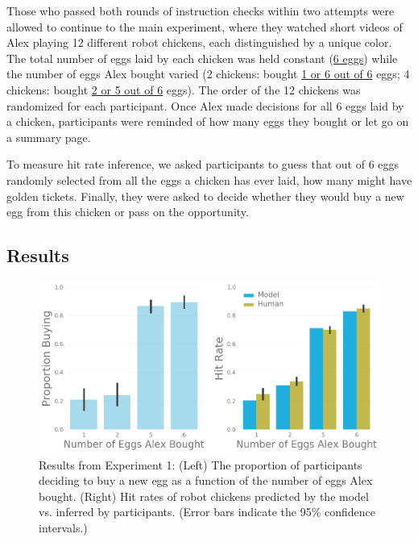 \documentclass[10pt,letterpaper]{article}
\begin{document}
Those who passed both rounds of instruction checks within two attempts were allowed to continue to the main experiment, where they watched short videos of Alex playing 12 different robot chickens, each distinguished by a unique color. The total number of eggs laid by each chicken was held constant (\underline{6 eggs}) while the number of eggs Alex bought varied (2 chickens: bought \underline{1 or 6 out of 6} eggs; 4 chickens: bought \underline{2 or 5 out of 6} eggs). The order of the 12 chickens was randomized for each participant. Once Alex made decisions for all 6 eggs laid by a chicken, participants were reminded of how many eggs they bought or let go on a summary page. 

To measure hit rate inference, we asked participants to guess that out of 6 eggs randomly selected from all the eggs a chicken has ever laid, how many might have golden tickets. Finally, they were asked to decide whether they would buy a new egg from this chicken or pass on the opportunity. 

\subsection{Results} 
\begin{figure}[t]
  \includegraphics[width=\linewidth]{exp1.png}
  \caption{Results from Experiment 1: (Left) The proportion of participants deciding to buy a new egg as a function of the number of eggs Alex bought. (Right) Hit rates of robot chickens predicted by the model vs. inferred by participants. (Error bars indicate the 95\% confidence intervals.)}
  \label{fig:exp1}
\end{figure}
\end{document}
